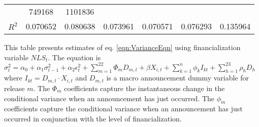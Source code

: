 \begin{sidewaystable}
{\begin{tabular}{@{}lllllllllllll@{}}
                                & \multicolumn{2}{c}{ 749168 }                                                   & \multicolumn{2}{c}{ 1101836 }                                                 \\ \textbf{$R^2$}             &\multicolumn{2}{c}{ 0.070652 }                                                 & \multicolumn{2}{c}{ 0.080638 }                                                 & \multicolumn{2}{c}{ 0.073961 }                                                 & \multicolumn{2}{c}{ 0.070571 }                                                 & \multicolumn{2}{c}{ 0.076293 }                                                   & \multicolumn{2}{c}{ 0.135964 }                                                 \\ \bottomrule 
\end{tabular}
}
\begin{tablenotes}\item 
        \singlespacing
        \footnotesize
        This table presents estimates of eq. \ref{eqn:VarianceEqn} using financialization variable $NLS_t$. The equation is $\sigma_{t}^2=\alpha_0+\alpha_1 \sigma_{t-1}^2+\alpha_2 \epsilon_t^2 +\sum_{m=1}^{22} \Phi_m D_{m,t}+\beta X_{i,t}+\sum_{k=1}^n \phi_k I_{kt} + \sum_{h=1}^{23} \rho_h D_h$ where $I_{kt}=D_{m,t} \cdot X_{i,t}$ and $D_{m,t}$ is a macro announcement dummy variable for release $m$. The $\Phi_m$ coefficients capture the instantaneous change in the conditional variance when an announcement has just occurred. The $\phi_m$ coefficients capture the conditional variance when an announcement has just occurred in conjunction with the level of financialization.
\end{tablenotes}
\end{sidewaystable}



